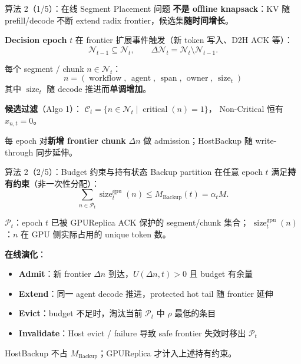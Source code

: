 \documentclass[aspectratio=43]{beamer}
\begin{document}
\begin{frame}{算法 2（1/5）：在线 Segment Placement 问题}
  \small
  \textbf{不是 offline knapsack}：KV 随 prefill/decode 不断 extend radix frontier，候选集\textbf{随时间增长}。

  \vspace{0.08cm}
  \textbf{Decision epoch} $t$ 在 frontier 扩展事件触发（新 token 写入、D2H ACK 等）：
  \[
    \mathcal{N}_{t-1} \subseteq \mathcal{N}_t,
    \qquad
    \Delta\mathcal{N}_t = \mathcal{N}_t \setminus \mathcal{N}_{t-1}.
  \]

  \vspace{0.06cm}
  每个 segment / chunk $n \in \mathcal{N}_t$：
  \[
    n = (\operatorname{workflow},\,\operatorname{agent},\,\operatorname{span},\,\operatorname{owner},\,\operatorname{size}_t)
  \]
  其中 $\operatorname{size}_t$ 随 decode 推进而\textbf{单调增加}。

  \vspace{0.06cm}
  \textbf{候选过滤}（Algo 1）：
  $\mathcal{C}_t = \{ n \in \mathcal{N}_t \mid \operatorname{critical}(n)=1 \}$，
  Non-Critical 恒有 $x_{n,t}=0$。

  \vspace{0.04cm}
  \footnotesize
  每 epoch 对\textbf{新增 frontier chunk} $\Delta n$ 做 admission；HostBackup 随 write-through 同步延伸。
\end{frame}

\begin{frame}{算法 2（2/5）：Budget 约束与持有状态}
  \small
  Backup partition 在任意 epoch $t$ 满足\textbf{持有约束}（非一次性分配）：
  \[
    \sum_{n \in \mathcal{P}_t} \operatorname{size}^{\mathrm{gpu}}_t(n)
    \le
    M_{\mathrm{Backup}}(t) = \alpha_t M .
  \]

  \vspace{0.06cm}
  $\mathcal{P}_t$：epoch $t$ 已被 GPUReplica ACK 保护的 segment/chunk 集合；
  $\operatorname{size}^{\mathrm{gpu}}_t(n)$：$n$ 在 GPU 侧实际占用的 unique token 数。

  \vspace{0.08cm}
  \textbf{在线演化}：
  \begin{itemize}
    \item \textbf{Admit}：新 frontier $\Delta n$ 到达，$U(\Delta n,t)>0$ 且 budget 有余量
    \item \textbf{Extend}：同一 agent decode 推进，protected hot tail 随 frontier 延伸
    \item \textbf{Evict}：budget 不足时，淘汰当前 $\mathcal{P}_t$ 中 $\rho$ 最低的条目
    \item \textbf{Invalidate}：Host evict / failure 导致 safe frontier 失效时移出 $\mathcal{P}_t$
  \end{itemize}

  \vspace{0.04cm}
  \footnotesize
  HostBackup 不占 $M_{\mathrm{Backup}}$；GPUReplica 才计入上述持有约束。
\end{frame}
\end{document}
